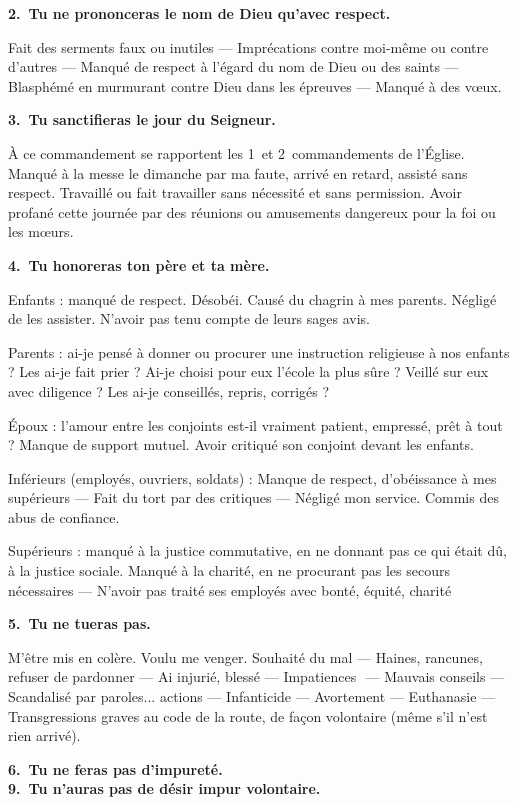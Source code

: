 \documentclass[%
a5paper%
,11pt%
,DIV=15%
,titlepage=on%
,headings=optiontoheadandtoc%
,headings=small%
,parskip=false%
,openany%
]{scrbook}
\newcommand{\commandement}[1]{\noindent\textbf{#1}}
\begin{document}
\commandement{2. Tu ne prononceras le nom de Dieu qu’avec respect.}

Fait des serments faux ou inutiles — Imprécations contre moi-même ou contre
d’autres — Manqué de respect à l’égard
du nom de Dieu ou des saints — Blasphémé en murmurant contre Dieu dans
les épreuves — Manqué à des vœux.

\commandement{3. Tu sanctifieras le jour du Seigneur.}

À ce commandement se rapportent les 1\ier\ et 2\ieme\ commandements de l’Église.
Manqué à la messe le dimanche par ma faute, arrivé
en retard, assisté sans respect. Travaillé
ou fait travailler sans nécessité et sans
permission. Avoir profané
cette journée par des réunions ou amusements dangereux pour la foi ou les
mœurs.

\commandement{4. Tu honoreras ton père et ta mère.}

Enfants : manqué de respect. Désobéi.
Causé du chagrin à mes parents. Négligé
de les assister. N’avoir pas tenu compte de
leurs sages avis.

Parents : ai-je pensé à donner ou procurer
une instruction religieuse à nos enfants ?
Les ai-je fait prier ? Ai-je choisi pour eux
l’école la plus sûre ? Veillé sur eux avec
diligence ? Les ai-je conseillés, repris,
corrigés ?

Époux : l’amour entre les conjoints est-il
vraiment patient, empressé, prêt à tout ?
Manque de support mutuel. Avoir critiqué
son conjoint devant les enfants.

Inférieurs (employés, ouvriers, soldats) :
Manque de respect, d’obéissance à mes
supérieurs — Fait du tort par des critiques
— Négligé mon service. Commis des abus
de confiance.

Supérieurs : manqué à la justice commutative, en ne donnant pas ce qui était dû, à
la justice sociale. Manqué à la charité, en
ne procurant pas les secours nécessaires
— N’avoir pas traité ses employés avec
bonté, équité, charité

\commandement{5. Tu ne tueras pas.}

M’être mis en colère. Voulu me venger.
Souhaité du mal — Haines, rancunes, refuser de pardonner — Ai injurié, blessé
— Impatiences ­ — Mauvais conseils —
Scandalisé par paroles... actions — Infanticide — Avortement — Euthanasie —
Transgressions graves au code de la route,
de façon volontaire (même s’il n’est rien
arrivé).

\commandement{6. Tu ne feras pas d'impureté.\\
9. Tu n'auras pas de désir impur volontaire.}
\end{document}

